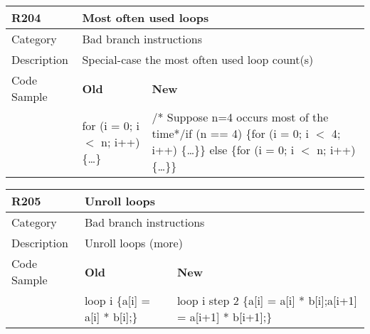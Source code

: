 \begin{tabular}{|p{0.9in}|p{2.0in}|p{2.0in}|} \hline
\textbf{R204}       & \multicolumn{2}{|p{4.0in}|}{\textbf{Most often used loops}} \\ \hline
Category            & \multicolumn{2}{|p{4.0in}|}{Bad branch instructions} \\ \hline
Description         & \multicolumn{2}{|p{4.0in}|}{Special-case the most often used loop count(s)} \\ \hline
Code Sample         & \textbf{Old} & \textbf{New} \\ \hline
                    & for (i = 0; i $<$ n; i++)\newline \{\ldots\}
                    & /* Suppose n=4 occurs most of the time*/\newline if (n == 4) \{\newline   for (i = 0; i $<$ 4; i++) \newline     \{\ldots\}\newline \} else \{\newline   for (i = 0; i $<$ n; i++) \newline     \{\ldots\}\newline \} \\ \hline
\end{tabular}

\begin{tabular}{|p{0.9in}|p{2.0in}|p{2.0in}|} \hline
\textbf{R205}       & \multicolumn{2}{|p{4.0in}|}{\textbf{Unroll loops}} \\ \hline
Category            & \multicolumn{2}{|p{4.0in}|}{Bad branch instructions} \\ \hline
Description         & \multicolumn{2}{|p{4.0in}|}{Unroll loops (more)} \\ \hline
Code Sample         & \textbf{Old} & \textbf{New} \\ \hline
                    & loop i \{\newline   a[i] = a[i] * b[i];\newline \}
                    & loop i step 2 \{\newline   a[i] = a[i] * b[i];\newline   a[i+1] = a[i+1] * b[i+1];\newline \} \\ \hline
\end{tabular}

